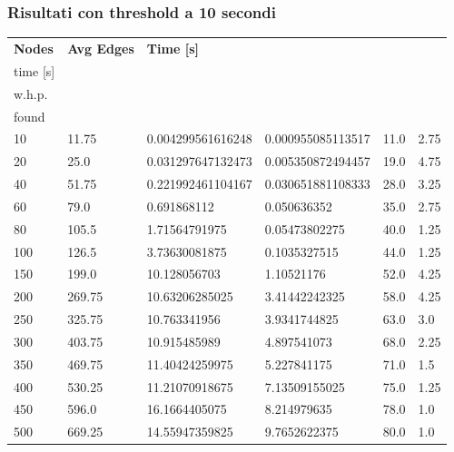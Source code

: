 \subsubsection{Risultati con threshold a 10 secondi}
\begin{longtable}{llllll}
  \textbf{Nodes} & \textbf{Avg Edges} & \textbf{Time {[}s{]}} & \textbf{\begin{tabular}[c]{@{}l@{}}Discovery\\ time {[}s{]}\end{tabular}} & \textbf{\begin{tabular}[c]{@{}l@{}}Avg rep\\ w.h.p.\end{tabular}} & \textbf{\begin{tabular}[c]{@{}l@{}}Avg mincut\\ found\end{tabular}} \\
  \endhead
  10 & 11.75 & 0.004299561616248 & 0.000955085113517 & 11.0 & 2.75 \\
  20 & 25.0 & 0.031297647132473 & 0.005350872494457 & 19.0 & 4.75 \\
  40 & 51.75 & 0.221992461104167 & 0.030651881108333 & 28.0 & 3.25 \\
  60 & 79.0 & 0.691868112 & 0.050636352 & 35.0 & 2.75 \\
  80 & 105.5 & 1.71564791975 & 0.05473802275 & 40.0 & 1.25 \\
  100 & 126.5 & 3.73630081875 & 0.1035327515 & 44.0 & 1.25 \\
  150 & 199.0 & 10.128056703 & 1.10521176 & 52.0 & 4.25 \\
  200 & 269.75 & 10.63206285025 & 3.41442242325 & 58.0 & 4.25 \\
  250 & 325.75 & 10.763341956 & 3.9341744825 & 63.0 & 3.0 \\
  300 & 403.75 & 10.915485989 & 4.897541073 & 68.0 & 2.25 \\
  350 & 469.75 & 11.40424259975 & 5.227841175 & 71.0 & 1.5 \\
  400 & 530.25 & 11.21070918675 & 7.13509155025 & 75.0 & 1.25 \\
  450 & 596.0 & 16.1664405075 & 8.214979635 & 78.0 & 1.0 \\
  500 & 669.25 & 14.55947359825 & 9.7652622375 & 80.0 & 1.0
  \end{longtable}